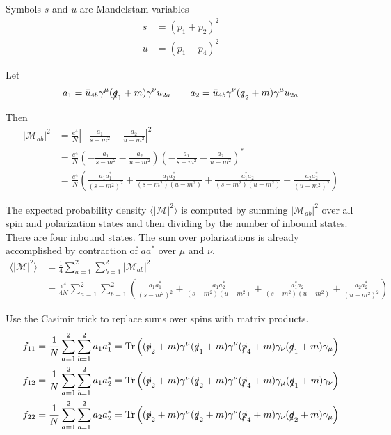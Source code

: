 \documentclass[12pt]{article}
\begin{document}
\noindent
Symbols $s$ and $u$ are Mandelstam variables
\begin{align*}
s&=(p_1+p_2)^2
\\
u&=(p_1-p_4)^2
\end{align*}

\noindent
Let
\begin{equation*}
a_1=\bar{u}_{4b}\gamma^\mu(\slashed{q}_1+m)\gamma^\nu u_{2a}
\qquad
a_2=\bar{u}_{4b}\gamma^\nu(\slashed{q}_2+m)\gamma^\mu u_{2a}
\end{equation*}

\noindent
Then
\begin{align*}
|\mathcal{M}_{ab}|^2&=\frac{e^4}{N}\left|-\frac{a_1}{s-m^2}-\frac{a_2}{u-m^2}\right|^2\\
&=
\frac{e^4}{N}
\left(-\frac{a_1}{s-m^2}-\frac{a_2}{u-m^2}\right)
\left(-\frac{a_1}{s-m^2}-\frac{a_2}{u-m^2}\right)^*\\
&=
\frac{e^4}{N}\left(
\frac{a_1a_1^*}{(s-m^2)^2}
+\frac{a_1a_2^*}{(s-m^2)(u-m^2)}
+\frac{a_1^*a_2}{(s-m^2)(u-m^2)}
+\frac{a_2a_2^*}{(u-m^2)^2}
\right)
\end{align*}

\noindent
The expected probability density $\langle|\mathcal{M}|^2\rangle$ is
computed by summing $|\mathcal{M}_{ab}|^2$ over all spin and polarization states
and then dividing by the number of inbound states.
There are four inbound states.
The sum over polarizations is already accomplished by contraction of $aa^*$ over $\mu$ and $\nu$.
\begin{align*}
\langle|\mathcal{M}|^2\rangle
&=\frac{1}{4}\sum_{a=1}^2\sum_{b=1}^2|\mathcal{M}_{ab}|^2\\
&=\frac{e^4}{4N}\sum_{a=1}^2\sum_{b=1}^2
\left(
\frac{a_1a_1^*}{(s-m^2)^2}
+\frac{a_1a_2^*}{(s-m^2)(u-m^2)}
+\frac{a_1^*a_2}{(s-m^2)(u-m^2)}
+\frac{a_2a_2^*}{(u-m^2)^2}
\right)
\end{align*}

\noindent
Use the Casimir trick to replace sums over spins with matrix products.
\begin{align*}
f_{11}&=\frac{1}{N} \sum_{a=1}^2\sum_{b=1}^2 a_1a_1^*=\mathop{\rm Tr}
\left(
(\slashed{p}_2+m)\gamma^\mu(\slashed{q}_1+m)\gamma^\nu(\slashed{p}_4+m)\gamma_\nu(\slashed{q}_1+m)\gamma_\mu
\right)
\\
f_{12}&=\frac{1}{N} \sum_{a=1}^2\sum_{b=1}^2 a_1a_2^*=\mathop{\rm Tr}
\left(
(\slashed{p}_2+m)\gamma^\mu(\slashed{q}_2+m)\gamma^\nu(\slashed{p}_4+m)\gamma_\mu(\slashed{q}_1+m)\gamma_\nu
\right)
\\
f_{22}&=\frac{1}{N} \sum_{a=1}^2\sum_{b=1}^2 a_2a_2^*=\mathop{\rm Tr}
\left(
(\slashed{p}_2+m)\gamma^\mu(\slashed{q}_2+m)\gamma^\nu(\slashed{p}_4+m)\gamma_\nu(\slashed{q}_2+m)\gamma_\mu
\right)
\end{align*}
\end{document}
